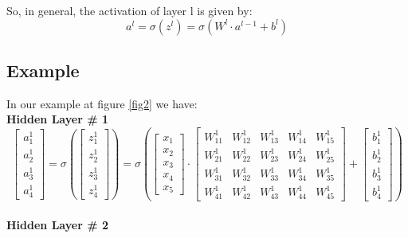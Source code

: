 \documentclass[12pt]{article}
\begin{document}
So, in general, the activation of layer l is given by:
\begin{equation}
    a^{l} = \sigma (z^{l}) = \sigma ( W^{l} \cdot a^{l-1} + b^{l} )
\end{equation}

\subsection{Example}

In our example at figure \ref{fig2} we have:
\\
\textbf{Hidden Layer \# 1}
\begin{equation}
\begin{bmatrix}
a_{1}^{1}\\
a_{2}^{1}\\
a_{3}^{1}\\
a_{4}^{1}
\end{bmatrix}
=
\sigma
\left(
\begin{bmatrix}
z_{1}^{1}\\
z_{2}^{1}\\
z_{3}^{1}\\
z_{4}^{1}
\end{bmatrix}
\right)
=
\sigma
\left(
\begin{bmatrix}
x_{1}\\
x_{2}\\
x_{3}\\
x_{4}\\
x_{5}
\end{bmatrix}
\cdot
\begin{bmatrix}
W_{11}^{1} & W_{12}^{1} & W_{13}^{1} & W_{14}^{1} & W_{15}^{1} \\
W_{21}^{1} & W_{22}^{1} & W_{23}^{1} & W_{24}^{1} & W_{25}^{1} \\
W_{31}^{1} & W_{32}^{1} & W_{33}^{1} & W_{34}^{1} & W_{35}^{1} \\
W_{41}^{1} & W_{42}^{1} & W_{43}^{1} & W_{44}^{1} & W_{45}^{1} 
\end{bmatrix}
 +
 \begin{bmatrix}
b_{1}^{1}\\
b_{2}^{1}\\
b_{3}^{1}\\
b_{4}^{1}
\end{bmatrix}
\right)
\end{equation}
\\
\textbf{Hidden Layer \# 2}
\end{document}
